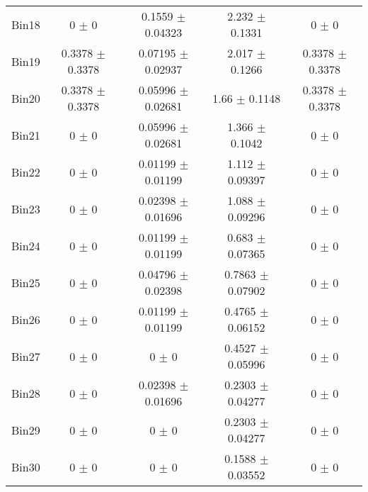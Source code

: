 \begin{tabular}{@{\extracolsep{4pt}}lcccc@{}}
     Bin18 & 0 $\pm$ 0 & 0.1559 $\pm$ 0.04323 & 2.232 $\pm$ 0.1331 & 0 $\pm$ 0 \\ 
     Bin19 & 0.3378 $\pm$ 0.3378 & 0.07195 $\pm$ 0.02937 & 2.017 $\pm$ 0.1266 & 0.3378 $\pm$ 0.3378 \\ 
     Bin20 & 0.3378 $\pm$ 0.3378 & 0.05996 $\pm$ 0.02681 & 1.66 $\pm$ 0.1148 & 0.3378 $\pm$ 0.3378 \\ 
     Bin21 & 0 $\pm$ 0 & 0.05996 $\pm$ 0.02681 & 1.366 $\pm$ 0.1042 & 0 $\pm$ 0 \\ 
     Bin22 & 0 $\pm$ 0 & 0.01199 $\pm$ 0.01199 & 1.112 $\pm$ 0.09397 & 0 $\pm$ 0 \\ 
     Bin23 & 0 $\pm$ 0 & 0.02398 $\pm$ 0.01696 & 1.088 $\pm$ 0.09296 & 0 $\pm$ 0 \\ 
     Bin24 & 0 $\pm$ 0 & 0.01199 $\pm$ 0.01199 & 0.683 $\pm$ 0.07365 & 0 $\pm$ 0 \\ 
     Bin25 & 0 $\pm$ 0 & 0.04796 $\pm$ 0.02398 & 0.7863 $\pm$ 0.07902 & 0 $\pm$ 0 \\ 
     Bin26 & 0 $\pm$ 0 & 0.01199 $\pm$ 0.01199 & 0.4765 $\pm$ 0.06152 & 0 $\pm$ 0 \\ 
     Bin27 & 0 $\pm$ 0 & 0 $\pm$ 0 & 0.4527 $\pm$ 0.05996 & 0 $\pm$ 0 \\ 
     Bin28 & 0 $\pm$ 0 & 0.02398 $\pm$ 0.01696 & 0.2303 $\pm$ 0.04277 & 0 $\pm$ 0 \\ 
     Bin29 & 0 $\pm$ 0 & 0 $\pm$ 0 & 0.2303 $\pm$ 0.04277 & 0 $\pm$ 0 \\ 
     Bin30 & 0 $\pm$ 0 & 0 $\pm$ 0 & 0.1588 $\pm$ 0.03552 & 0 $\pm$ 0 \\ 
\hline\hline
  \end{tabular}
